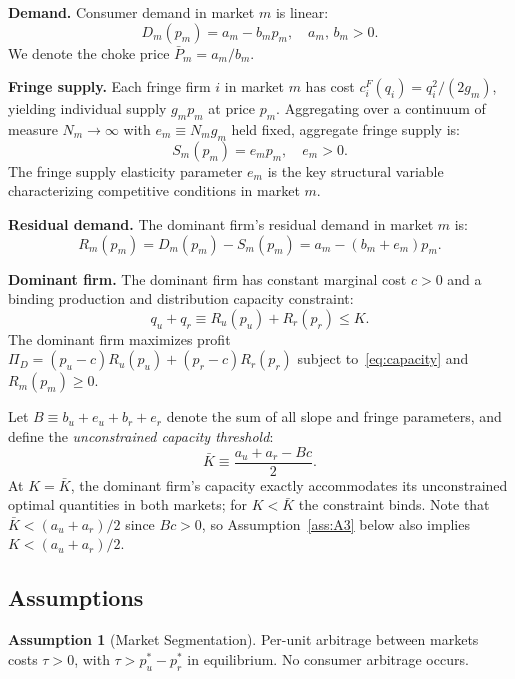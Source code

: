 \documentclass[12pt]{article}
\theoremstyle{plain}
\theoremstyle{definition}
\newtheorem{assumption}{Assumption}
\theoremstyle{remark}
\begin{document}
\textbf{Demand.}  Consumer demand in market $m$ is linear:
\begin{equation}
  D_m(p_m) = a_m - b_m p_m, \quad a_m,\, b_m > 0.
\end{equation}
We denote the choke price $\bar{P}_m = a_m/b_m$.

\textbf{Fringe supply.}  Each fringe firm $i$ in market $m$ has cost
$c_i^F(q_i) = q_i^2/(2g_m)$, yielding individual supply $g_m p_m$ at price $p_m$.
Aggregating over a continuum of measure $N_m \to \infty$ with $e_m \equiv N_m g_m$
held fixed, aggregate fringe supply is:
\begin{equation}
  S_m(p_m) = e_m p_m, \quad e_m > 0.
\end{equation}
The fringe supply elasticity parameter $e_m$ is the key structural variable
characterizing competitive conditions in market $m$.

\textbf{Residual demand.}  The dominant firm's residual demand in market $m$ is:
\begin{equation}
  R_m(p_m) = D_m(p_m) - S_m(p_m) = a_m - (b_m + e_m)p_m.
\end{equation}

\textbf{Dominant firm.}  The dominant firm has constant marginal cost $c > 0$
and a binding production and distribution capacity constraint:
\begin{equation}
  q_u + q_r \equiv R_u(p_u) + R_r(p_r) \leq K.
  \label{eq:capacity}
\end{equation}
The dominant firm maximizes profit $\Pi_D = (p_u - c)R_u(p_u) + (p_r - c)R_r(p_r)$
subject to~\eqref{eq:capacity} and $R_m(p_m) \geq 0$.

Let $B \equiv b_u + e_u + b_r + e_r$ denote the sum of all slope and fringe
parameters, and define the \emph{unconstrained capacity threshold}:
\begin{equation}
  \bar{K} \equiv \frac{a_u + a_r - Bc}{2}.
  \label{eq:Kbar}
\end{equation}
At $K = \bar{K}$, the dominant firm's capacity exactly accommodates its
unconstrained optimal quantities in both markets; for $K < \bar{K}$ the
constraint binds.  Note that $\bar{K} < (a_u + a_r)/2$ since $Bc > 0$,
so Assumption~\ref{ass:A3} below also implies $K < (a_u + a_r)/2$.

\subsection{Assumptions}

\begin{assumption}[Market Segmentation]
\label{ass:A1}
Per-unit arbitrage between markets costs $\tau > 0$, with $\tau > p_u^* - p_r^*$
in equilibrium.  No consumer arbitrage occurs.
\end{assumption}
\end{document}
